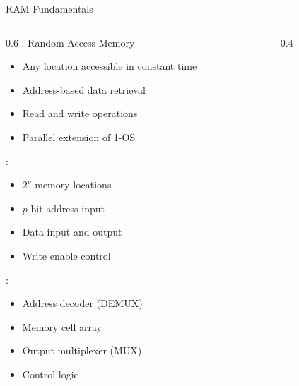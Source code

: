 \begin{frame}{RAM Fundamentals}
\begin{columns}
\begin{column}{0.6\textwidth}
: Random Access Memory
\begin{itemize}
\item Any location accessible in constant time
\item Address-based data retrieval
\item Read and write operations
\item Parallel extension of 1-OS
\end{itemize}
\vspace{0.3cm}
:
\begin{itemize}
\item $2^p$ memory locations
\item $p$-bit address input
\item Data input and output
\item Write enable control
\end{itemize}
\vspace{0.3cm}
:
\begin{itemize}
\item Address decoder (DEMUX)
\item Memory cell array
\item Output multiplexer (MUX)
\item Control logic
\end{itemize}
\end{column}
\begin{column}{0.4\textwidth}
\begin{center}

\end{center}
\end{column}
\end{columns}
\end{frame}
